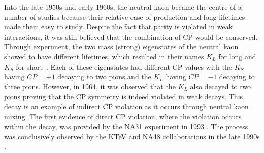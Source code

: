 \documentclass[../main.tex]{subfiles}
\begin{document}
    Into the late 1950s and early 1960s, the neutral kaon became the centre of a number of studies because their relative ease of production and long lifetimes made them easy to study. Despite the fact that parity is violated in weak interactions, it was still believed that the combination of \gls{CP} would be conserved. 
    Through experiment, the two mass (strong) eigenstates of the neutral kaon showed to have different lifetimes, which resulted in their names $K_L$ for long and $K_S$ for short~\cite{BARDON1958156}. Each of these eigenstates had different \gls{CP} values with the $K_S$ having $CP = +1$ decaying to two pions and the $K_L$ having $CP = -1$ decaying to three pions.
    However, in 1964, it was observed that the $K_L$ also decayed to two pions \cite{PhysRevLett.13.138} proving that the \gls{CP} symmetry is indeed violated in weak decays. This decay is an example of indirect \gls{CP} violation as it occurs through neutral kaon mixing. The first evidence of direct \gls{CP} violation, where the violation occurs within the decay, was provided by the NA31 experiment in 1993 \cite{BARR1993233}. The process was conclusively observed by the KTeV and NA48 collaborations in the late 1990s \cite{1999335, PhysRevLett.83.22}.
    \begin{table}[t]
        \centering
        \caption{Properties of charged and neutral kaons \cite{Navas:2024}.}
        \label{tab:kaons_types}
    \end{table}
\end{document}
